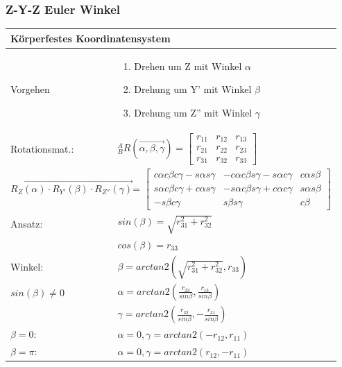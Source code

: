 \begin{minipage}{9.5cm}
    \vspace{0.5cm}
    \subsubsection{Z-Y-Z Euler Winkel }
   	\begin{tabular}{|p{2.5cm}|p{6cm}|}
    \hline
       	\multicolumn{2}{|l|}{Körperfestes Koordinatensystem}\\  	
    \hline
    Vorgehen&
    \vspace{-0.3cm}
    \begin{enumerate}
        \item Drehen um Z mit Winkel $\alpha$
        \item Drehung um Y' mit Winkel $\beta$
        \item Drehung um Z'' mit Winkel $\gamma$\vspace{-0.5cm}
    \end{enumerate}\\
    \hline
       	Rotationsmat.:
   		& ${^A_B}R(\overrightarrow{\alpha,\beta,\gamma}) = 
   			\begin{bmatrix} 
		    	r_{11} & r_{12} & r_{13} \\
       r_{21} & r_{22} & r_{23} \\
       r_{31} & r_{32} & r_{33}                              
   \end{bmatrix}$ \\
	\hline
        \multicolumn{2}{|l|}{{\scriptsize 
        $ \overrightarrow{R_Z(\alpha)\cdot R_{Y'}(\beta) \cdot R_{Z''}(\gamma)}$= $\begin{bmatrix} 
           c\alpha c\beta c\gamma - s \alpha s \gamma &-c\alpha c\beta s\gamma-s\alpha c\gamma &c\alpha s\beta \\
           s\alpha c\beta c\gamma + c \alpha s \gamma& -s\alpha c\beta s\gamma+c\alpha c\gamma & s\alpha s\beta\\
           -s\beta c\gamma& s\beta s\gamma& c\beta
        \end{bmatrix}$
    }}\\\hline 
		Ansatz:
		& $sin(\beta) = \sqrt{r^2_{31} + r^2_{32}}$ \\
		& $cos(\beta) = r_{33}$\\
	\hline
		Winkel:
		& $\beta=arctan2(\sqrt{r^2_{31}+r^2_{32}},r_{33})$\\
		$ sin(\beta) \neq 0 $& $\alpha=arctan2(\frac{r_{23}}{sin\beta},\frac{r_{13}}{sin\beta})$\\
		& $\gamma=arctan2(\frac{r_{32}}{sin\beta},-\frac{r_{31}}{sin\beta})$\\
	\hline
		$\beta=0$:
		& $\alpha=0,\gamma=arctan2(-r_{12},r_{11})$\\
		$\beta=\pi$:
		& $\alpha=0,\gamma=arctan2(r_{12},-r_{11})$\\
	\hline
    \end{tabular} 	
\end{minipage}
	

